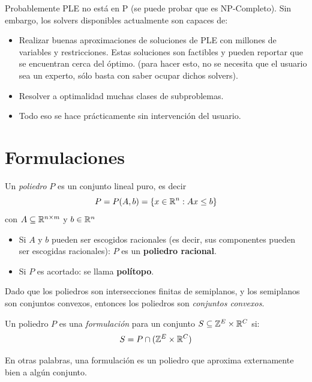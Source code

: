 Probablemente PLE no está en P (se puede probar que es NP-Completo). Sin embargo, los solvers disponibles actualmente son capaces de:
\begin{itemize}
    \item Realizar buenas aproximaciones de soluciones de PLE con millones de variables y restricciones. Estas soluciones son factibles y pueden reportar que se encuentran cerca del óptimo. (para hacer esto, no se necesita que el usuario sea un experto, sólo basta con saber ocupar dichos solvers).
    \item Resolver a optimalidad muchas clases de subproblemas.
    \item Todo eso se hace prácticamente sin intervención del usuario.
\end{itemize}

\section{Formulaciones}
\begin{defi}[Poliedro] Un \emph{poliedro} $P$ es un conjunto lineal puro, es decir
$$P=P(A,b)=\{x\in \mathbb R^n:Ax\leq b\}$$
con $A\subseteq \mathbb R^{n\times m}$ y $b\in \mathbb R^n$
\end{defi}
\begin{itemize}
    \item Si $A$ y $b$ pueden ser escogidos racionales (es decir, sus componentes pueden ser escogidas racionales): $P$ es un \textbf{poliedro racional}.
    \item Si $P$ es acortado: se llama \textbf{polítopo}.
\end{itemize}
\begin{obs}
Dado que los poliedros son intersecciones finitas de semiplanos, y los semiplanos son conjuntos convexos, entonces los poliedros son \textit{conjuntos convexos}.
\end{obs}
\begin{defi}[Formulación] Un poliedro $P$ es una \emph{formulación} para un conjunto $S\subseteq\mathbb Z^E \times \mathbb R^ C$ si:
$$S=P\cap (\mathbb Z^E \times \mathbb R^C)$$
\end{defi}
En otras palabras, una formulación es un poliedro que aproxima externamente bien a algún conjunto.

